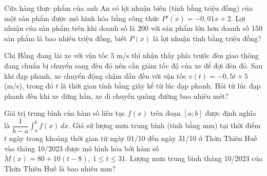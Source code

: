 \begin{bt}%
	Cửa hàng thực phẩm của anh An có lợi nhuận biên (tính bằng triệu đồng) của một sản  phẩm được mô hình hóa bằng công thức $P'(x)=-0{,}01x+2$. Lợi nhuận của sản phẩm trên khi doanh số là $200$ với sản phẩm lớn hơn doanh số $150$ sản phẩm là bao nhiêu triệu đồng, biết $P(x)$ là lợi nhuận tính bằng triệu đồng?
\end{bt}

\begin{bt}%
	Chị Hồng đang lái xe với vận tốc $5$ m/s thì nhận thấy phía trước đèn giao thông đang chuẩn bị chuyển sang đèn đỏ nên cần giảm tốc độ của xe để đợi đèn đỏ. Sau khi đạp phanh, xe chuyển động chậm dần đều với  vận tốc $v(t)=-0{,}5t+5$ (m/s), trong đó $t$ là thời gian tính bằng giây kể từ lúc đạp phanh. Hỏi từ lúc đạp phanh đến khi xe dừng hẳn, xe di chuyển quãng đường bao nhiêu mét?
\end{bt}

\begin{bt}%
	Giá trị trung bình của hàm số liên tục $f(x)$ trên đoạn $[a;b]$ được định nghĩa là $\dfrac{1}{b-a}\displaystyle\int_a^b{f(x){\,d}x}$. Giả sử lượng mưa trung bình (tính bằng mm) tại thời điểm $t$ ngày trong khoảng thời gian từ ngày 01/10 đến ngày 31/10 ở Thừa Thiên Huế vào tháng 10/2023 được mô hình hóa bởi hàm số $M(x)=80+10(t-8),~1\le t\le 31$. Lượng mưa trung bình tháng  10/2023 của Thừa Thiên Huế là bao nhiêu mm?
\end{bt}

